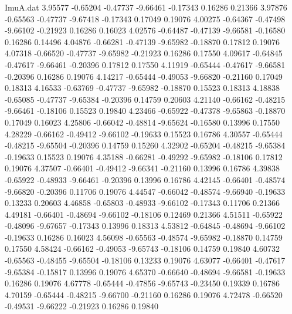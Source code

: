 \begin{filecontents}{ImuA.dat}
   3.95577   -0.65204   -0.47737   -9.66461   -0.17343    0.16286    0.21366
   3.97876   -0.65563   -0.47737   -9.67418   -0.17343    0.17049    0.19076
   4.00275   -0.64367   -0.47498   -9.66102   -0.21923    0.16286    0.16023
   4.02576   -0.64487   -0.47139   -9.66581   -0.16580    0.16286    0.14496
   4.04876   -0.66281   -0.47139   -9.65982   -0.18870    0.17812    0.19076
   4.07318   -0.66520   -0.47737   -9.65982   -0.21923    0.16286    0.17550
   4.09617   -0.64845   -0.47617   -9.66461   -0.20396    0.17812    0.17550
   4.11919   -0.65444   -0.47617   -9.66581   -0.20396    0.16286    0.19076
   4.14217   -0.65444   -0.49053   -9.66820   -0.21160    0.17049    0.18313
   4.16533   -0.63769   -0.47737   -9.65982   -0.18870    0.15523    0.18313
   4.18838   -0.65085   -0.47737   -9.65384   -0.20396    0.14759    0.20603
   4.21140   -0.66162   -0.48215   -9.66461   -0.18106    0.15523    0.19840
   4.23466   -0.65922   -0.47378   -9.65863   -0.18870    0.17049    0.16023
   4.25806   -0.66042   -0.48814   -9.65624   -0.16580    0.13996    0.17550
   4.28229   -0.66162   -0.49412   -9.66102   -0.19633    0.15523    0.16786
   4.30557   -0.65444   -0.48215   -9.65504   -0.20396    0.14759    0.15260
   4.32902   -0.65204   -0.48215   -9.65384   -0.19633    0.15523    0.19076
   4.35188   -0.66281   -0.49292   -9.65982   -0.18106    0.17812    0.19076
   4.37507   -0.66401   -0.49412   -9.66341   -0.21160    0.13996    0.16786
   4.39838   -0.65922   -0.48933   -9.66461   -0.20396    0.13996    0.16786
   4.42145   -0.66401   -0.48574   -9.66820   -0.20396    0.11706    0.19076
   4.44547   -0.66042   -0.48574   -9.66940   -0.19633    0.13233    0.20603
   4.46858   -0.65803   -0.48933   -9.66102   -0.17343    0.11706    0.21366
   4.49181   -0.66401   -0.48694   -9.66102   -0.18106    0.12469    0.21366
   4.51511   -0.65922   -0.48096   -9.67657   -0.17343    0.13996    0.18313
   4.53812   -0.64845   -0.48694   -9.66102   -0.19633    0.16286    0.16023
   4.56098   -0.65563   -0.48574   -9.65982   -0.18870    0.14759    0.17550
   4.58424   -0.66162   -0.49053   -9.65743   -0.18106    0.14759    0.19840
   4.60732   -0.65563   -0.48455   -9.65504   -0.18106    0.13233    0.19076
   4.63077   -0.66401   -0.47617   -9.65384   -0.15817    0.13996    0.19076
   4.65370   -0.66640   -0.48694   -9.66581   -0.19633    0.16286    0.19076
   4.67778   -0.65444   -0.47856   -9.65743   -0.23450    0.19339    0.16786
   4.70159   -0.65444   -0.48215   -9.66700   -0.21160    0.16286    0.19076
   4.72478   -0.66520   -0.49531   -9.66222   -0.21923    0.16286    0.19840

\end{filecontents}
